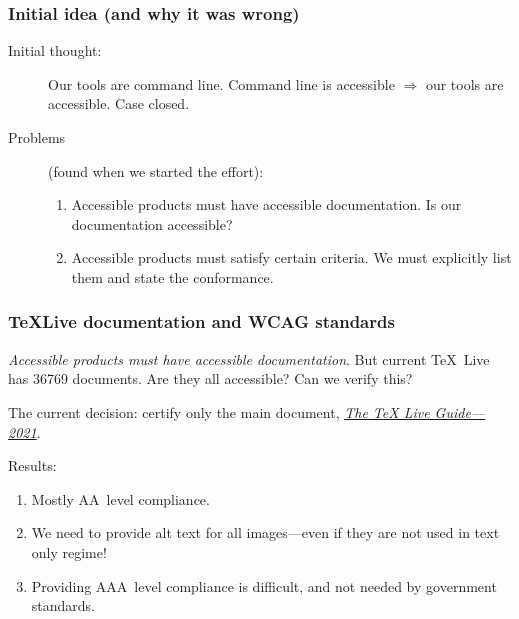 \documentclass{beamer}
\begin{document}
\begin{frame}
  \frametitle{Initial idea (and why it was wrong)}

  \begin{description}
  \item[Initial thought:] Our tools are command line. Command line is
    accessible  $\Rightarrow$ our tools are accessible.  Case
    closed.  
  \item[Problems] (found when we started the effort):
    \begin{enumerate}
    \item Accessible products must have accessible documentation.  Is
      our documentation accessible?
    \item Accessible products must satisfy certain criteria.  We must
      explicitly list them and state the conformance.
    \end{enumerate}

  \end{description}
  
\end{frame}

\begin{frame}
  \frametitle{\TeX Live documentation and WCAG standards}
  \emph{Accessible products must have accessible documentation}.  But
  current \TeX\ Live has \num{36769} documents.  Are they all
  accessible? Can we verify this?

  The current decision: certify only the main document,
  \emph{\href{https://www.tug.org/texlive/doc/texlive-en/texlive-en.html}{The
      TeX Live Guide—2021}}.

  Results:
  \begin{enumerate}
  \item Mostly AA~level compliance.
  \item We need to provide alt text for all images---even if they are
    not used in text only regime!
  \item Providing AAA~level compliance is difficult, and not needed by
    government standards.
  \end{enumerate}

\end{frame}
\end{document}

